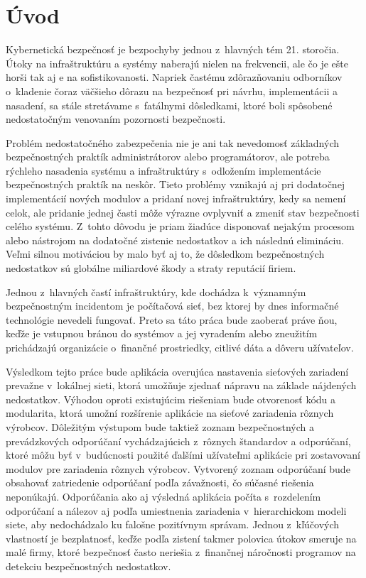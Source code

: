 \chapter*{Úvod}
{}

Kybernetická bezpečnosť je bezpochyby jednou z~hlavných tém 21. storočia. Útoky na infraštruktúru a systémy naberajú nielen na frekvencii, ale čo je ešte horši tak aj e na sofistikovanosti. Napriek častému zdôrazňovaniu odborníkov o~kladenie čoraz väčšieho dôrazu na bezpečnosť pri návrhu, implementácii a nasadení, sa stále stretávame s~fatálnymi dôsledkami, ktoré boli spôsobené nedostatočným venovaním pozornosti bezpečnosti. 

Problém nedostatočného zabezpečenia nie je ani tak nevedomosť základných bezpečnostných praktík administrátorov alebo programátorov, ale potreba rýchleho nasadenia systému a infraštruktúry s~odložením implementácie bezpečnostných praktík na neskôr. Tieto problémy vznikajú aj pri dodatočnej implementácií nových modulov a pridaní novej infraštruktúry, kedy sa nemení celok, ale pridanie jednej časti môže výrazne ovplyvniť a zmeniť stav bezpečnosti celého systému. Z~tohto dôvodu je priam žiadúce disponovať nejakým procesom alebo nástrojom na dodatočné zistenie nedostatkov a ich následnú elimináciu. Veľmi silnou motiváciou by malo byť aj to, že dôsledkom bezpečnostných nedostatkov sú globálne miliardové škody a straty reputácií firiem. 

Jednou z~hlavných častí infraštruktúry, kde dochádza k~významným bezpečnostným incidentom je počítačová sieť, bez ktorej by dnes informačné technológie nevedeli fungovať. Preto sa táto práca bude zaoberať práve ňou, keďže je vstupnou bránou do systémov a jej vyradením alebo zneužitím prichádzajú organizácie o~finančné prostriedky, citlivé dáta a dôveru užívateľov.

Výsledkom tejto práce bude aplikácia overujúca nastavenia sieťových zariadení prevažne v~lokálnej sieti, ktorá umožňuje zjednať nápravu na základe nájdených nedostatkov. Výhodou oproti existujúcim riešeniam bude otvorenosť kódu a modularita, ktorá umožní rozšírenie aplikácie na sieťové zariadenia rôznych výrobcov. Dôležitým výstupom bude taktiež zoznam bezpečnostných a prevádzkových odporúčaní vychádzajúcich z~rôznych štandardov a odporúčaní, ktoré môžu byť v~budúcnosti použité ďalšími užívateľmi aplikácie pri zostavovaní modulov pre zariadenia rôznych výrobcov. Vytvorený zoznam odporúčaní bude obsahovať zatriedenie odporúčaní podľa závažnosti, čo súčasné riešenia neponúkajú. Odporúčania ako aj výsledná aplikácia počíta s~rozdelením odporúčaní a nálezov aj podľa umiestnenia zariadenia v~hierarchickom modeli siete, aby nedochádzalo ku falošne pozitívnym správam. Jednou z~kľúčových vlastností je bezplatnosť, keďže podľa zistení takmer polovica útokov smeruje na malé firmy, ktoré bezpečnosť často neriešia z~finančnej náročnosti programov na detekciu bezpečnostných nedostatkov.    

